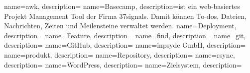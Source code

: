  {
  name=awk,
  description={}
}
 {
  name=Basecamp,
  description={ist ein web-basiertes Projekt Management Tool der Firma 37signals. Damit können To-dos, Dateien, Nachrichten, Zeiten und Meilensteine verwaltet werden.}
}
 {
  name=Deployment,
  description={}
}
 {
  name=Feature,
  description={}
}
 {
  name=find,
  description={}
}
 {
  name=git,
  description={}
}
 {
  name=GitHub,
  description={}
}
 {
  name=inpsyde GmbH,
  description={}
}
 {
  name=produkt,
  description={}
}
 {
  name=Repository,
  description={}
}
 {
  name=rsync,
  description={}
}
 {
  name=WordPress,
  description={}
}
 {
  name=Zielsystem,
  description={}
}


\makeglossaries